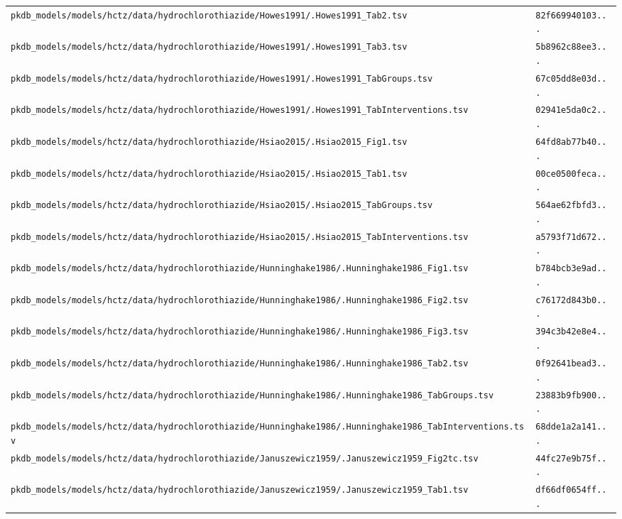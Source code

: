 \begin{longtable}{ll}
\texttt{pkdb\_models/models/hctz/data/hydrochlorothiazide/Howes1991/.Howes1991\_Tab2.tsv} & \texttt{82f669940103...} \\
\texttt{pkdb\_models/models/hctz/data/hydrochlorothiazide/Howes1991/.Howes1991\_Tab3.tsv} & \texttt{5b8962c88ee3...} \\
\texttt{pkdb\_models/models/hctz/data/hydrochlorothiazide/Howes1991/.Howes1991\_TabGroups.tsv} & \texttt{67c05dd8e03d...} \\
\texttt{pkdb\_models/models/hctz/data/hydrochlorothiazide/Howes1991/.Howes1991\_TabInterventions.tsv} & \texttt{02941e5da0c2...} \\
\texttt{pkdb\_models/models/hctz/data/hydrochlorothiazide/Hsiao2015/.Hsiao2015\_Fig1.tsv} & \texttt{64fd8ab77b40...} \\
\texttt{pkdb\_models/models/hctz/data/hydrochlorothiazide/Hsiao2015/.Hsiao2015\_Tab1.tsv} & \texttt{00ce0500feca...} \\
\texttt{pkdb\_models/models/hctz/data/hydrochlorothiazide/Hsiao2015/.Hsiao2015\_TabGroups.tsv} & \texttt{564ae62fbfd3...} \\
\texttt{pkdb\_models/models/hctz/data/hydrochlorothiazide/Hsiao2015/.Hsiao2015\_TabInterventions.tsv} & \texttt{a5793f71d672...} \\
\texttt{pkdb\_models/models/hctz/data/hydrochlorothiazide/Hunninghake1986/.Hunninghake1986\_Fig1.tsv} & \texttt{b784bcb3e9ad...} \\
\texttt{pkdb\_models/models/hctz/data/hydrochlorothiazide/Hunninghake1986/.Hunninghake1986\_Fig2.tsv} & \texttt{c76172d843b0...} \\
\texttt{pkdb\_models/models/hctz/data/hydrochlorothiazide/Hunninghake1986/.Hunninghake1986\_Fig3.tsv} & \texttt{394c3b42e8e4...} \\
\texttt{pkdb\_models/models/hctz/data/hydrochlorothiazide/Hunninghake1986/.Hunninghake1986\_Tab2.tsv} & \texttt{0f92641bead3...} \\
\texttt{pkdb\_models/models/hctz/data/hydrochlorothiazide/Hunninghake1986/.Hunninghake1986\_TabGroups.tsv} & \texttt{23883b9fb900...} \\
\texttt{pkdb\_models/models/hctz/data/hydrochlorothiazide/Hunninghake1986/.Hunninghake1986\_TabInterventions.tsv} & \texttt{68dde1a2a141...} \\
\texttt{pkdb\_models/models/hctz/data/hydrochlorothiazide/Januszewicz1959/.Januszewicz1959\_Fig2tc.tsv} & \texttt{44fc27e9b75f...} \\
\texttt{pkdb\_models/models/hctz/data/hydrochlorothiazide/Januszewicz1959/.Januszewicz1959\_Tab1.tsv} & \texttt{df66df0654ff...} \\

\end{longtable}
